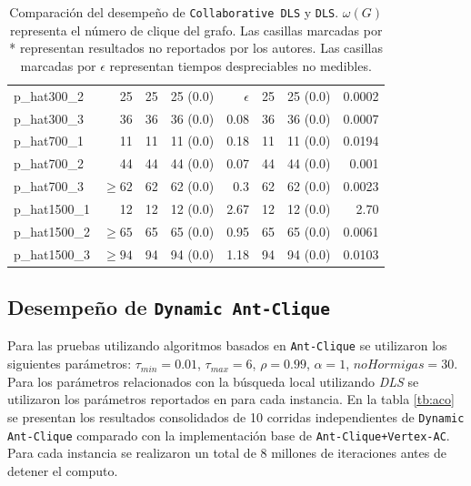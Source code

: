 \documentclass[conference]{IEEEtran}
\begin{document}
\begin{center}
\begin{table}[ht]
{\begin{tabular}{lr|rlr|rlr}
 p\_hat300\_2      &           25  &    25  &  25 (0.0)           &   $\epsilon$  &    25  &  25 (0.0)        &      0.0002  \\
 p\_hat300\_3      &           36  &    36  &  36 (0.0)           &         0.08  &    36  &  36 (0.0)        &      0.0007  \\
 p\_hat700\_1      &           11  &    11  &  11 (0.0)           &         0.18  &    11  &  11 (0.0)        &      0.0194  \\
 p\_hat700\_2      &           44  &    44  &  44 (0.0)           &         0.07  &    44  &  44 (0.0)        &       0.001  \\
 p\_hat700\_3      &    $\geq 62$  &    62  &  62 (0.0)           &          0.3  &    62  &  62 (0.0)        &      0.0023  \\
 p\_hat1500\_1     &           12  &    12  &  12 (0.0)           &         2.67  &    12  &  12 (0.0)        &        2.70  \\
 p\_hat1500\_2     &    $\geq 65$  &    65  &  65 (0.0)           &         0.95  &    65  &  65 (0.0)        &      0.0061  \\
 p\_hat1500\_3     &    $\geq 94$  &    94  &  94 (0.0)           &         1.18  &    94  &  94 (0.0)        &      0.0103  \\
\hline
\end{tabular}}
\hfill{}
\caption{Comparación del desempeño de \texttt{Collaborative DLS} y
  \texttt{DLS}. $\omega(G)$ representa el número de
  clique del grafo. Las casillas marcadas por * representan resultados
no reportados por los autores. Las casillas marcadas por $\epsilon$
representan tiempos despreciables no medibles.}
\label{tb:dls}
\end{table}
\end{center}

\subsection{Desempeño de \texttt{Dynamic Ant-Clique}}
\label{sec:aco_res}

Para las pruebas utilizando algoritmos basados en \texttt{Ant-Clique}
se utilizaron los siguientes parámetros: $\tau_{min} = 0.01$,
$\tau_{max} = 6$, $\rho = 0.99$, $\alpha = 1$, $noHormigas = 30$. Para
los parámetros relacionados con la búsqueda local utilizando
\emph{DLS} se utilizaron los parámetros reportados en \cite{dynamicl}
para cada instancia. En la tabla \ref{tb:aco} se presentan los
resultados consolidados de 10 corridas independientes de
\texttt{Dynamic Ant-Clique} comparado con la implementación base de
\texttt{Ant-Clique+Vertex-AC}. Para cada instancia se realizaron un
total de 8 millones de iteraciones antes de detener el computo.
\end{document}
